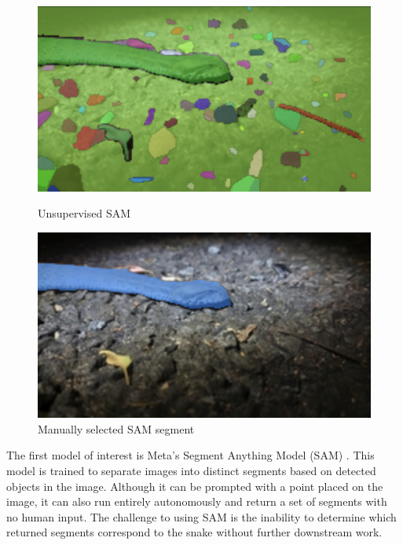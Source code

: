 \documentclass[]{ceurart}
\begin{document}
\begin{figure}[htbp]
    \centering
    \begin{minipage}{0.49\textwidth}
        \centering
        \includegraphics[width=\linewidth]{media/unsupervised-SAM.png}
        \caption{Unsupervised SAM}
        \label{fig:sam-snake}
    \end{minipage}\hfill
    \begin{minipage}{0.49\textwidth}
        \centering
        \includegraphics[width=\linewidth]{media/manul-selected-SAM.png}
        \caption{Manually selected SAM segment}
        \label{fig:enter-caption}
    \end{minipage}
\end{figure}

The first model of interest is Meta's Segment Anything Model (SAM) \cite{kirillov2023segment}. 
This model is trained to separate images into distinct segments based on detected objects in the image. 
Although it can be prompted with a point placed on the image, it can also run entirely autonomously and return a set of segments with no human input.
The challenge to using SAM is the inability to determine which returned segments correspond to the snake without further downstream work. 
\end{document}
